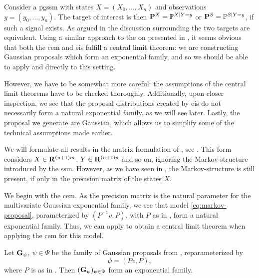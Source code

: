 Consider a \acrshort{pgssm} with states $X = (X_{0}, \dots, X_{n})$ and observations $y = (y_{0}, \dots, y_{n})$. The target of interest is then $\P^{X} = \mathbb P^{X| Y=y}$ or $\P^{S} = \mathbb P^{S | Y=y}$, if such a signal exists. As argued in the discussion surrounding  the two targets are equivalent. Using a similar approach to the on presented in , it seems obvious that both the \acrshort{cem} and \acrshort{eis} fulfill a central limit theorem: we are constructing Gaussian proposals which form an exponential family, and so we should be able to apply  and  directly to this setting. 

However, we have to be somewhat more careful: the assumptions of the central limit theorems have to be checked thoroughly. Additionally, upon closer inspection, we see that the proposal distributions created by \acrshort{eis} do not necessarily form a natural exponential family, as we will see later. Lastly, the proposal we generate are Gaussian, which allows us to simplify some of the technical assumptions made earlier.

We will formulate all results in the matrix formulation of , see \citep[Section 4.13]{Durbin2012Time}. This form considers $X\in\R^{(n+1)m}$, $Y\in\R^{(n+1)p}$ and so on, ignoring the Markov-structure introduced by the \acrshort{ssm}. However, as we have seen in , the Markov-structure is still present, if only in the precision matrix of the states $X$. 

We begin with the \acrshort{cem}. As the precision matrix is the natural parameter for the multivariate Gaussian exponential family, we see that model \eqref{eq:markov-proposal}, parameterized by $(P^{-1}v, P)$, with $P$ as in , form a natural exponential family. Thus, we can apply  to obtain a central limit theorem when applying the \acrshort{cem} for this model. 

\begin{lemma}
    \label{lem:markov_proposal_exponential_family}
    Let $\G_{\psi}$, $\psi \in \Psi$ be the family of Gaussian proposals from , reparameterized by 
    $$
        \psi = \left( Pv, P \right),
    $$
    where $P$ is as in . Then $(\G_{\psi})_{\psi \in \Psi}$ form an exponential family.
\end{lemma}

